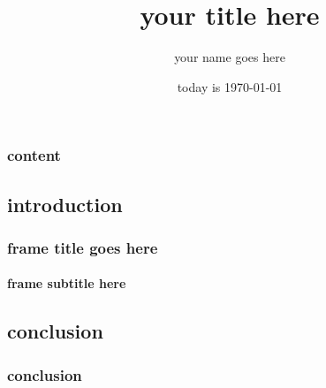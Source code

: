 \documentclass[10pt]{beamer}
\author{your name goes here}
\title{your title here}
\institute{your affiliation here}
\date{today is \MakeLowercase{\today}}
\begin{document}
\begin{frame}
\titlepage
\end{frame}
\begin{frame}
\frametitle{content}
\tableofcontents
\end{frame}
\begin{frame}
\section{introduction}
\frametitle{frame title goes here}
\framesubtitle{frame subtitle here}

\end{frame}
\begin{frame}
\section{conclusion}
\frametitle{conclusion}

\end{frame}
\end{document}
